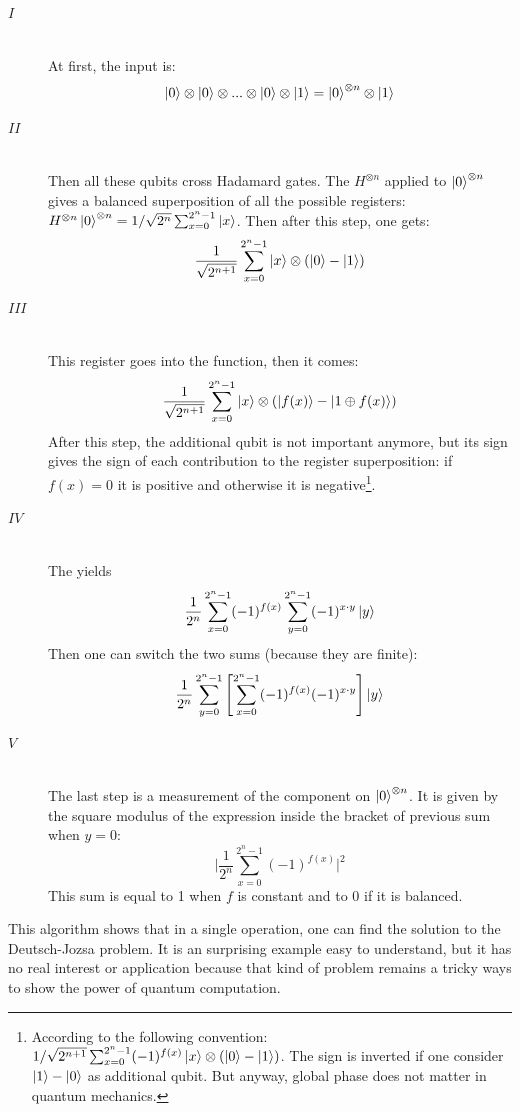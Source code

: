 \documentclass[twoside, open=right
]{scrreprt}
\newcommand{\g}{\ensuremath{\ket{0}}\xspace}
\newcommand{\e}{\ensuremath{\ket{1}}\xspace}
\begin{document}
\begin{description}
  \item[$I$] \hfill \\ At first, the input is: \[ \g \otimes \g \otimes ... \otimes \g \otimes \e = \g^{\otimes n} \otimes \e \]
  \item[$II$] \hfill \\ Then all these qubits cross Hadamard gates. The $H^{\otimes n}$ applied to $\g^{\otimes n}$ gives a balanced superposition of all the possible registers: $H^{\otimes n} \g^{\otimes n} = 1 / \sqrt{2^n} \sum_{x=0}^{2^n-1} \ket{x}$. Then after this step, one gets: \[ \frac{1}{\sqrt{2^{n+1}}}\sum_{x=0}^{2^n-1} \ket{x} \otimes (\g - \e) \]
  \item[$III$] \hfill \\ This register goes into the function, then it comes: \[ \frac{1}{\sqrt{2^{n+1}}}\sum_{x=0}^{2^n-1} \ket{x} \otimes (\ket{f(x)} - \ket{1\oplus f(x)} ) \]
After this step, the additional qubit is not important anymore, but its sign gives the sign of each contribution to the register superposition: if $f(x)=0$ it is positive and otherwise it is negative\footnote{According to the following convention: $1/\sqrt{2^{n+1}}\sum_{x=0}^{2^n-1} (-1)^{f(x)} \ket{x} \otimes (\g - \e)$. The sign is inverted if one consider $\e - \g$ as additional qubit. But anyway, global phase does not matter in quantum mechanics.}.
  \item[$IV$] \hfill \\ The  yields \[ \frac{1}{2^n}\sum_{x=0}^{2^n-1} (-1)^{f(x)} \sum_{y=0}^{2^n-1}(-1)^{x\cdot y} \ket{y} \]
Then one can switch the two sums (because they are finite): \[ \frac{1}{2^n}\sum_{y=0}^{2^n-1} \left[\sum_{x=0}^{2^n-1}(-1)^{f(x)} (-1)^{x\cdot y}\right] \ket{y} \]
  \item[$V$] \hfill \\ The last step is a measurement of the component on $\g^{\otimes n}$. It is given by the square modulus of the expression inside the bracket of previous sum when $y=0$: \[ \bigg|\frac{1}{2^n}\sum_{x=0}^{2^n-1}(-1)^{f(x)}\bigg|^2 \]
This sum is equal to 1 when $f$ is constant and to 0 if it is balanced.
\end{description}

\par This algorithm shows that in a single operation, one can find the solution to the Deutsch-Jozsa problem. It is an surprising example easy to understand, but it has no real interest or application because that kind of problem remains a tricky ways to show the power of quantum computation. 
\end{document}
